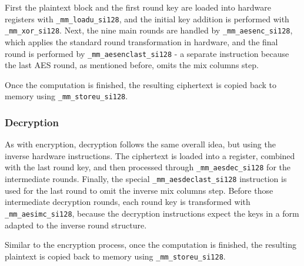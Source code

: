 First the plaintext block and the first round key are loaded into hardware registers with \texttt{\_mm\_loadu\_si128}, and the initial key addition is performed with \texttt{\_mm\_xor\_si128}. Next, the nine main rounds are handled by \texttt{\_mm\_aesenc\_si128}, which applies the standard round transformation in hardware, and the final round is performed by \texttt{\_mm\_aesenclast\_si128} - a separate instruction because the last AES round, as mentioned before, omits the mix columns step.

Once the computation is finished, the resulting ciphertext is copied back to memory using \texttt{\_mm\_storeu\_si128}.

\subsubsection{Decryption}

As with encryption, decryption follows the same overall idea, but using the inverse hardware instructions. The ciphertext is loaded into a register, combined with the last round key, and then processed through \texttt{\_mm\_aesdec\_si128} for the intermediate rounds. Finally, the special \texttt{\_mm\_aesdeclast\_si128} instruction is used for the last round to omit the inverse mix columns step. Before those intermediate decryption rounds, each round key is transformed with \texttt{\_mm\_aesimc\_si128}, because the decryption instructions expect the keys in a form adapted to the inverse round structure.

Similar to the encryption process, once the computation is finished, the resulting plaintext is copied back to memory using \texttt{\_mm\_storeu\_si128}.
